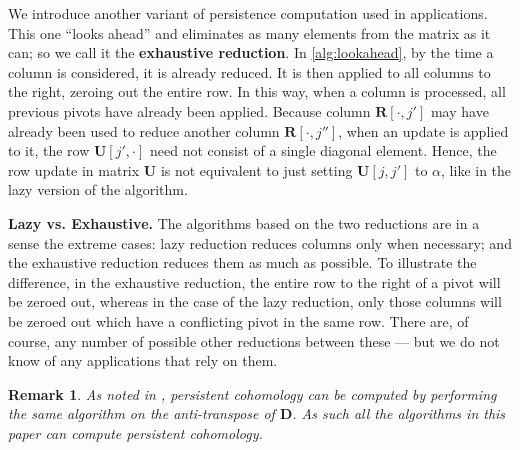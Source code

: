 \documentclass[10pt,a4paper]{article}
\newtheorem{remark}[theorem]{Remark}
\newcommand{\mat}[1]{\mathbf{#1}}
\renewcommand{\paragraph}[1]{\noindent\textbf{#1.}}
\begin{document}
We introduce another variant of persistence computation used in applications.  This one ``looks ahead'' and eliminates as many elements from the matrix as it can; so we call it the \textbf{exhaustive reduction}.
In \cref{alg:lookahead}, by the time a column is considered, it is already reduced.
It is then applied to all columns to the right, zeroing out the entire row.
In this way,
when a column is processed, all previous pivots have already been applied.
%
Because column $\mat{R}[\cdot,j']$ may have already been used to reduce another column
$\mat{R}[\cdot,j'']$, when an update is applied to it, the row $\mat{U}[j',\cdot]$
need not consist of a single diagonal element. Hence, the row update in matrix $\mat{U}$ is not
equivalent to just setting $\mat{U}[j,j']$ to $\alpha$, like in the lazy version
of the algorithm.

\vspace{0.1cm}
\paragraph{\textbf{Lazy vs. Exhaustive}}
%
The algorithms based on the two reductions are in a sense the extreme cases: lazy reduction reduces columns only when necessary; and the exhaustive reduction reduces them as much as possible. To illustrate the difference, in the exhaustive reduction, the entire row to the right of a pivot will be zeroed out, whereas in the case of the lazy reduction, only those columns will be zeroed out which have a conflicting pivot in the same row. There are, of course, any number of possible other reductions between these --- but we do not know of any applications that rely on them.


\begin{remark}
As noted in \cite[Section 3.4]{de2011dualities}, persistent cohomology can be computed by performing the same algorithm on the anti-transpose of $\mat{D}$. As such all the algorithms in this paper can compute persistent cohomology.%
 \end{remark}
\end{document}
